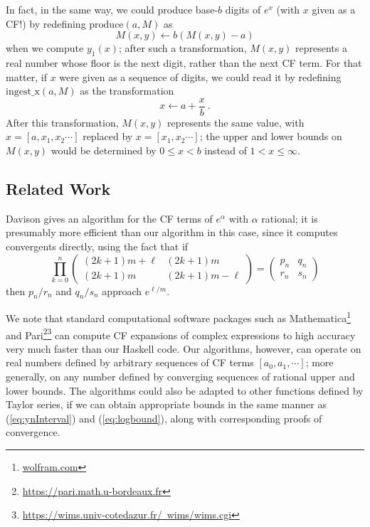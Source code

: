 \documentclass[11pt, oneside]{amsart}   	%
\renewcommand{\:}{\negthickspace:\negthickspace}
\begin{document}
In fact, in the same way, we could produce base-$b$ digits of $e^x$ (with $x$ given as a CF!) by redefining $\mbox{produce}(a, M)$ as
\[
M(x,y) \leftarrow b(M(x,y) - a)
\]
when we compute $y_1(x)$;
after such a transformation, $M(x,y)$ represents a real number whose floor is the next digit, rather than the next CF term. 
For that matter, if $x$ were given as a sequence of digits, we could read it by redefining $\mbox{ingest\_x}(a,M)$ as the transformation
\[
x \leftarrow a + \frac{x}{b} \ .
\]
 After this transformation, $M(x,y)$ represents the same value, with $x=[a,x_1,x_2\cdots]$ replaced by $x=[x_1,x_2\cdots]$; the upper and lower bounds on $M(x,y)$ would be determined by $0 \leq x < b$ instead of $1 <  x \leq \infty$.


\subsection{Related Work}
Davison \cite{DavisonCFexp} gives an algorithm for the CF terms of $e^{\alpha}$ with $\alpha$ rational;
it is presumably more efficient than our algorithm in this case, since it computes convergents directly, using the fact that if
\[
\prod_{k=0}^n \begin{pmatrix} (2k+1)m+\ell & (2k+1)m \\
                                                       (2k+1)m &  (2k+1)m-\ell \end{pmatrix} = \begin{pmatrix} p_n & q_n \\
                                                                                                                                             r_n & s_n \end{pmatrix}
\]
then $p_n/r_n$ and $q_n/s_n$ approach $e^{\ell/m}$.

We note that standard computational software packages such as Mathematica\footnote{\href{wolfram.com}{wolfram.com}} and Pari\footnote{\href{https://pari.math.u-bordeaux.fr}{https://pari.math.u-bordeaux.fr}}\footnote{\href{https://wims.univ-cotedazur.fr/~wims/wims.cgi}{https://wims.univ-cotedazur.fr/~wims/wims.cgi}} can compute CF expansions of complex expressions to high accuracy very much faster than our Haskell code.
Our algorithms, however, can operate on real numbers defined by arbitrary sequences of CF terms $[a_0,a_1,\cdots]$; more generally, on any number defined by converging sequences of rational upper and lower bounds.
The algorithms could also be adapted to other functions defined by Taylor series, if we can obtain appropriate bounds in the same manner as (\ref{eq:ynInterval}) and (\ref{eq:logbound}), along with corresponding proofs of convergence.
\end{document}
